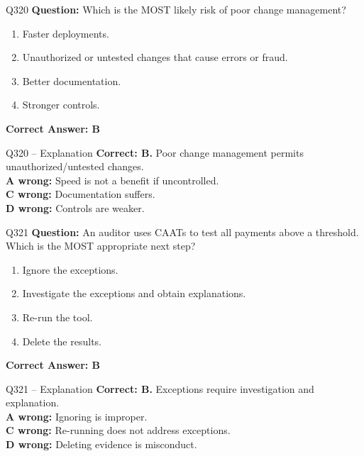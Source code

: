 \documentclass[aspectratio=169,10pt]{beamer}
\begin{document}
	\begin{frame}[t]{Q320}
		\small
		\textbf{Question:} Which is the MOST likely risk of poor change management?
		\begin{enumerate}[label=\Alph*.,itemsep=1pt,topsep=2pt]
			\item Faster deployments.
			\item Unauthorized or untested changes that cause errors or fraud.
			\item Better documentation.
			\item Stronger controls.
		\end{enumerate}
		\vspace{4pt}
		\textbf{Correct Answer: B}
	\end{frame}
	
	\begin{frame}[t]{Q320 -- Explanation}
		\small
		\textbf{Correct: B.} Poor change management permits unauthorized/untested changes. \\[4pt]
		\textbf{A wrong:} Speed is not a benefit if uncontrolled. \\[2pt]
		\textbf{C wrong:} Documentation suffers. \\[2pt]
		\textbf{D wrong:} Controls are weaker.
	\end{frame}
	
	\begin{frame}[t]{Q321}
		\small
		\textbf{Question:} An auditor uses CAATs to test all payments above a threshold. Which is the MOST appropriate next step?
		\begin{enumerate}[label=\Alph*.,itemsep=1pt,topsep=2pt]
			\item Ignore the exceptions.
			\item Investigate the exceptions and obtain explanations.
			\item Re-run the tool.
			\item Delete the results.
		\end{enumerate}
		\vspace{4pt}
		\textbf{Correct Answer: B}
	\end{frame}
	
	\begin{frame}[t]{Q321 -- Explanation}
		\small
		\textbf{Correct: B.} Exceptions require investigation and explanation. \\[4pt]
		\textbf{A wrong:} Ignoring is improper. \\[2pt]
		\textbf{C wrong:} Re-running does not address exceptions. \\[2pt]
		\textbf{D wrong:} Deleting evidence is misconduct.
	\end{frame}
	
\end{document}
